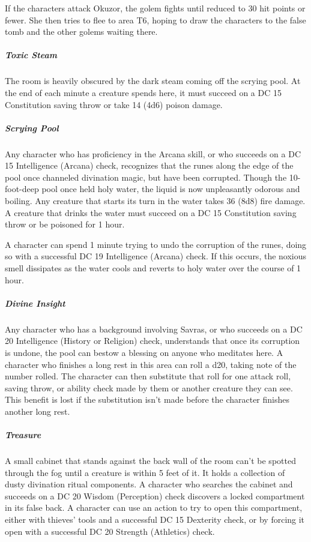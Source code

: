 \documentclass[10pt,a4paper,twoside,bg=print,twocolumn,openany,nodeprecatedcode]{dndbook}
\begin{document}
If the characters attack Okuzor, the golem fights until reduced to 30 hit points or fewer. She then tries to flee to area T6, hoping to draw the characters to the false tomb and the other golems waiting there.

\subparagraph{Toxic Steam}
The room is heavily obscured by the dark steam coming off the scrying pool. At the end of each minute a creature spends here, it must succeed on a DC 15 Constitution saving throw or take 14 (4d6) poison damage.

\subparagraph{Scrying Pool}
Any character who has proficiency in the Arcana skill, or who succeeds on a DC 15 Intelligence (Arcana) check, recognizes that the runes along the edge of the pool once channeled divination magic, but have been corrupted. Though the 10-foot-deep pool once held holy water, the liquid is now unpleasantly odorous and boiling. Any creature that starts its turn in the water takes 36 (8d8) fire damage. A creature that drinks the water must succeed on a DC 15 Constitution saving throw or be poisoned for 1 hour.

A character can spend 1 minute trying to undo the corruption of the runes, doing so with a successful DC 19 Intelligence (Arcana) check. If this occurs, the noxious smell dissipates as the water cools and reverts to holy water over the course of 1 hour.

\subparagraph{Divine Insight}
Any character who has a background involving Savras, or who succeeds on a DC 20 Intelligence (History or Religion) check, understands that once its corruption is undone, the pool can bestow a blessing on anyone who meditates here. A character who finishes a long rest in this area can roll a d20, taking note of the number rolled. The character can then substitute that roll for one attack roll, saving throw, or ability check made by them or another creature they can see. This benefit is lost if the substitution isn't made before the character finishes another long rest.

\subparagraph{Treasure}
A small cabinet that stands against the back wall of the room can't be spotted through the fog until a creature is within 5 feet of it. It holds a collection of dusty divination ritual components. A character who searches the cabinet and succeeds on a DC 20 Wisdom (Perception) check discovers a locked compartment in its false back. A character can use an action to try to open this compartment, either with thieves' tools and a successful DC 15 Dexterity check, or by forcing it open with a successful DC 20 Strength (Athletics) check.
\end{document}
